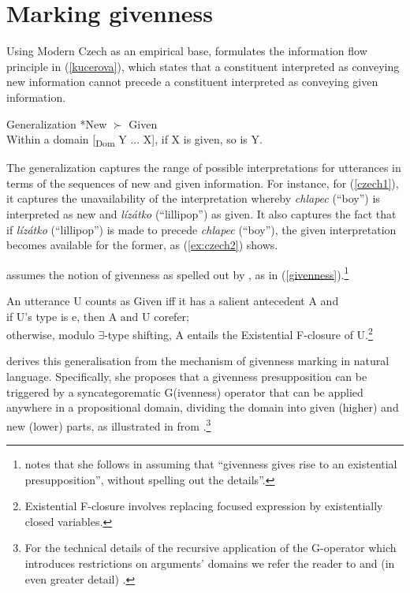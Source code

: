 \documentclass[output=paper,modfonts,nonflat]{langsci/langscibook}
\begin{document}
\section{Marking givenness}

Using Modern Czech as an empirical base, \citet{Kucerova:2012} formulates the information flow principle in (\ref{kucerova}), which states that a constituent interpreted as conveying new information cannot precede a constituent interpreted as conveying given information. 

\ea \label{kucerova}
Generalization *New $\succ$ Given \\
Within a domain [\textsubscript{Dom} Y ... X], if X is given, so is Y. \hfill \citet[14]{Kucerova:2012}
\z

The generalization captures the range of possible interpretations for utterances in terms of the sequences of new and given information. For instance, for (\ref{czech1}), it captures the unavailability of the interpretation whereby {\itshape chlapec} (``boy'') is interpreted as new and {\itshape l\'{i}z\'{a}tko} (``lillipop'') as given. It also captures the fact that if {\itshape l\'{i}z\'{a}tko} (``lillipop'') is made to precede {\itshape chlapec} (``boy''), the given interpretation becomes available for the former, as (\ref{ex:czech2}) shows.

\citet[18]{Kucerova:2012} assumes the notion of givenness as spelled out by \citet[151]{Schwarzschild:1999}, as in (\ref{givenness}).\footnote{\citet[18]{Kucerova:2012} notes that she follows \citealt{Sauerland:2005} in assuming that ``givenness gives rise to an existential presupposition'', without spelling out the details''.}

\ea\label{givenness}
An utterance U counts as Given iff it has a salient antecedent A and\\
\ea if U's type is e, then A and U corefer;\\
\ex otherwise, modulo $\exists$-type shifting, A entails the Existential F-closure of U.\footnote{Existential F-closure involves replacing focused expression by existentially closed variables.}
\z
\z

\citet[14]{Kucerova:2012} derives this generalisation from the mechanism of givenness marking in natural language. Specifically, she proposes that a givenness presupposition can be triggered by a syncategorematic G(ivenness) operator that can be applied anywhere in a propositional domain, dividing the domain into given (higher) and new (lower) parts, as illustrated in  from \citet[3]{Kucerova:2012}.\footnote{For the technical details of the recursive application of the G-operator which introduces restrictions on arguments' domains we refer the reader to \citet{Kucerova:2012} and (in even greater detail) \citet{SimikWierzba:2015}.}
\end{document}
